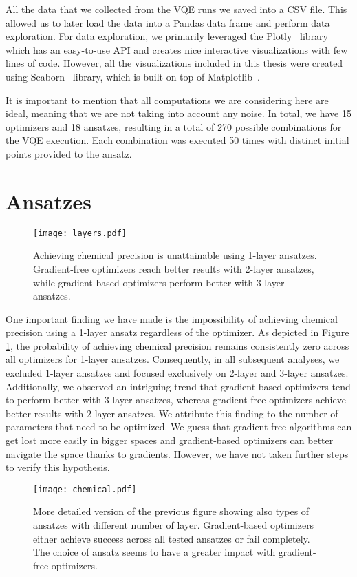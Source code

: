 All the data that we collected from the VQE runs we saved into a CSV file. This allowed us to later load the data into a Pandas data frame and perform data exploration. For data exploration, we primarily leveraged the Plotly~\cite{plotly} library which has an easy-to-use API and creates nice interactive visualizations with few lines of code. However, all the visualizations included in this thesis were created using Seaborn~\cite{seaborn} library, which is built on top of Matplotlib~\cite{seaborn}.

It is important to mention that all computations we are considering here are ideal, meaning that we are not taking into account any noise. In total, we have 15 optimizers and 18 ansatzes, resulting in a total of 270 possible combinations for the VQE execution. Each combination was executed 50 times with distinct initial points provided to the ansatz.

\section{Ansatzes}
\begin{figure}[H]
    \centering
    \texttt{[image: layers.pdf]}
    \caption{Achieving chemical precision is unattainable using 1-layer ansatzes. Gradient-free optimizers reach better results with 2-layer ansatzes, while gradient-based optimizers perform better with 3-layer ansatzes.}
    \label{fig:ansatz-layers}
\end{figure}
One important finding we have made is the impossibility of achieving chemical precision using a 1-layer ansatz regardless of the optimizer. As depicted in Figure \ref{fig:ansatz-layers}, the probability of achieving chemical precision remains consistently zero across all optimizers for 1-layer ansatzes. Consequently, in all subsequent analyses, we excluded 1-layer ansatzes and focused exclusively on 2-layer and 3-layer ansatzes. Additionally, we observed an intriguing trend that gradient-based optimizers tend to perform better with 3-layer ansatzes, whereas gradient-free optimizers achieve better results with 2-layer ansatzes. We attribute this finding to the number of parameters that need to be optimized. We guess that gradient-free algorithms can get lost more easily in bigger spaces and gradient-based optimizers can better navigate the space thanks to gradients. However, we have not taken further steps to verify this hypothesis. 

\begin{figure}[H]
    \centering
    \texttt{[image: chemical.pdf]}
    \caption{More detailed version of the previous figure showing also types of ansatzes with different number of layer. Gradient-based optimizers either achieve success across all tested ansatzes or fail completely. The choice of ansatz seems to have a greater impact with gradient-free optimizers.}
    \label{fig:chemical}
\end{figure}

